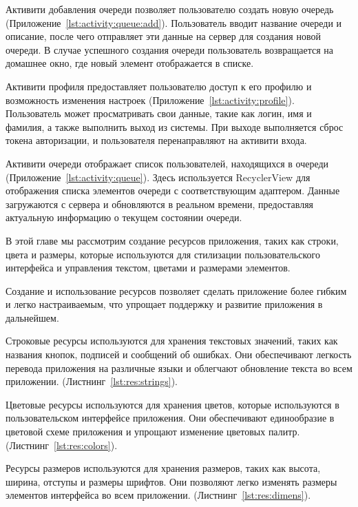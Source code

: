 Активити добавления очереди позволяет пользователю создать новую очередь
(Приложение~\ref{lst:activity:queue:add}).
Пользователь вводит название очереди и описание,
после чего отправляет эти данные на сервер для создания новой очереди.
В случае успешного создания очереди пользователь возвращается на домашнее окно,
где новый элемент отображается в списке.

Активити профиля предоставляет пользователю доступ к его профилю
и возможность изменения настроек (Приложение~\ref{lst:activity:profile}).
Пользователь может просматривать свои данные,
такие как логин, имя и фамилия, а также выполнить выход из системы.
При выходе выполняется сброс токена авторизации,
и пользователя перенаправляют на активити входа.

Активити очереди отображает список пользователей, находящихся в очереди
(Приложение~\ref{lst:activity:queue}).
Здесь используется RecyclerView для отображения списка элементов очереди
с соответствующим адаптером.
Данные загружаются с сервера и обновляются в реальном времени,
предоставляя актуальную информацию о текущем состоянии очереди.


В этой главе мы рассмотрим создание ресурсов приложения,
таких как строки, цвета и размеры, которые используются
для стилизации пользовательского интерфейса и управления текстом,
цветами и размерами элементов.\par
Создание и использование ресурсов позволяет сделать приложение более гибким
и легко настраиваемым, что упрощает поддержку
и развитие приложения в дальнейшем.

Строковые ресурсы используются для хранения текстовых значений,
таких как названия кнопок, подписей и сообщений об ошибках.
Они обеспечивают легкость перевода приложения на различные языки
и облегчают обновление текста во всем приложении.
(Листнинг~\ref{lst:res:strings}).

Цветовые ресурсы используются для хранения цветов,
которые используются в пользовательском интерфейсе приложения.
Они обеспечивают единообразие в цветовой схеме приложения
и упрощают изменение цветовых палитр.
(Листнинг~\ref{lst:res:colors}).

Ресурсы размеров используются для хранения размеров,
таких как высота, ширина, отступы и размеры шрифтов.
Они позволяют легко изменять размеры элементов интерфейса во всем приложении.
(Листнинг~\ref{lst:res:dimens}).

